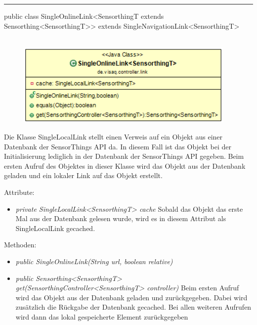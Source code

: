 \rule{\textwidth}{0.4pt}
public class SingleOnlineLink<SensorthingT extends Sensorthing<SensorthingT>> extends SingleNavigationLink<SensorthingT>
\\\\
\begin{minipage}{0.5\textwidth}
    \begin{figure}[H]
        {\centering\includegraphics[width=0.95\textwidth]{media/backend/controller/classes/SingleOnlineLink.png}}
    \end{figure}
    \end{minipage} \hfill
\begin{minipage}{0.5\textwidth}
    Die Klasse SingleLocalLink stellt einen Verweis auf ein Objekt aus einer Datenbank der \gls{SensorThings API} da.
    In diesem Fall ist das Objekt bei der Initialisierung lediglich in der Datenbank der \gls{SensorThings API} gegeben.
    Beim ersten Aufruf des Objektes in dieser Klasse wird das Objekt aus der Datenbank geladen und ein lokaler Link auf das Objekt erstellt.
\end{minipage}

Attribute:
\begin{itemize}
    \item \emph{private SingleLocalLink<SensorthingT> cache} Sobald das Objekt das erste Mal aus der Datenbank gelesen wurde, wird es in diesem Attribut als SingleLocalLink gecached.
\end{itemize}
Methoden:
\begin{itemize}
    \item \emph{public SingleOnlineLink(String url, boolean relative)}
    \relativeDescription
    \item \emph{public Sensorthing<SensorthingT> get(SensorthingController<SensorthingT> controller)}
    Beim ersten Aufruf wird das Objekt aus der Datenbank geladen und zurückgegeben.
    Dabei wird zusätzlich die Rückgabe der Datenbank gecached.
    Bei allen weiteren Aufrufen wird dann das lokal gespeicherte Element zurückgegeben
\end{itemize}

